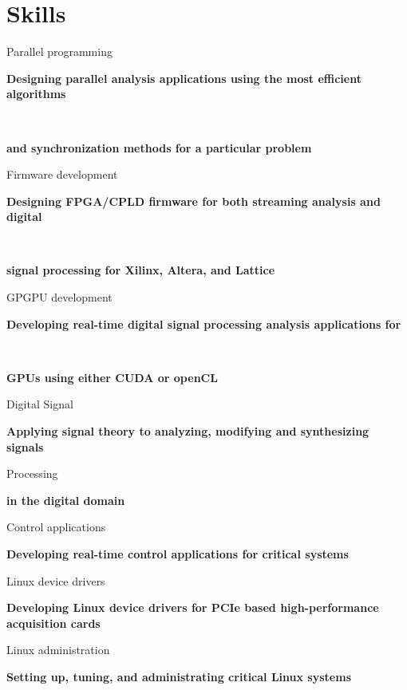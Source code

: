 \documentclass[]{cv-style}          %
\begin{document}
\section{Skills}
  \vspace{-0.2cm}
\begin{entrylist}
\parbox[t]{3.7cm}{Parallel programming}  \textbf{Designing parallel analysis applications using the most efficient algorithms} \\
 \vspace{\parsep}
 \parbox[t]{3.7cm}{ ~}	\textbf{and synchronization methods for a particular problem} \\
 \parbox[t]{3.7cm}{Firmware development}  \textbf{Designing FPGA/CPLD firmware for both streaming analysis and digital} \\
 \vspace{\parsep}
 \parbox[t]{3.7cm}{ ~}	\textbf{signal processing for Xilinx, Altera, and Lattice} \\
  \parbox[t]{3.7cm}{GPGPU development}  \textbf{Developing real-time digital signal processing analysis applications for} \\
 \vspace{\parsep}
 \parbox[t]{3.7cm}{ ~}	\textbf{GPUs using either CUDA or openCL} \\
   \parbox[t]{3.7cm}{Digital Signal}  \textbf{Applying signal theory to analyzing, modifying and synthesizing signals } \\
 \vspace{\parsep}
 \parbox[t]{3.7cm}{Processing}	\textbf{in the digital domain} \\
 \vspace{\parsep}
   \parbox[t]{3.7cm}{Control applications}  \textbf{Developing real-time control applications for critical systems} \\
 \vspace{\parsep}
   \parbox[t]{3.7cm}{Linux device drivers}  \textbf{Developing Linux device drivers for PCIe based high-performance acquisition cards} \\
  \parbox[t]{3.7cm}{Linux administration}  \textbf{Setting up, tuning, and administrating critical Linux systems} \\
 


\end{entrylist}

\end{document}
